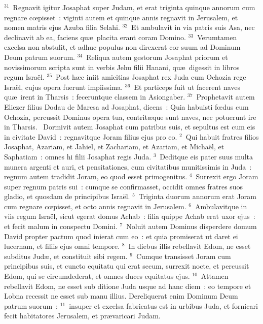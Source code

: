 ${}^{31}$~Regnavit igitur Josaphat super Judam, et erat triginta quinque annorum cum regnare cœpisset~: viginti autem et quinque annis regnavit in Jerusalem, et nomen matris ejus Azuba filia Selahi.
${}^{32}$~Et ambulavit in via patris suis Asa, nec declinavit ab ea, faciens qu\ae\ placita erant coram Domino.
${}^{33}$~Verumtamen excelsa non abstulit, et adhuc populus non direxerat cor suum ad Dominum Deum patrum suorum.
${}^{34}$~Reliqua autem gestorum Josaphat priorum et novissimorum scripta sunt in verbis Jehu filii Hanani, qu\ae\ digessit in libros regum Isra\"el.
${}^{35}$~Post h\ae c iniit amicitias Josaphat rex Juda cum Ochozia rege Isra\"el, cujus opera fuerunt impiissima.
${}^{36}$~Et particeps fuit ut facerent naves qu\ae\ irent in Tharsis~: feceruntque classem in Asiongaber.
${}^{37}$~Prophetavit autem Eliezer filius Dodau de Maresa ad Josaphat, dicens~: Quia habuisti fœdus cum Ochozia, percussit Dominus opera tua, contrit\ae que sunt naves, nec potuerunt ire in Tharsis.
~\lettrine[lines=10,image=true,loversize=0.05,lraise=-0.03]{D}{}ormivit autem Josaphat cum patribus suis, et sepultus est cum eis in civitate David~: regnavitque Joram filius ejus pro eo.
${}^{2}$~Qui habuit fratres filios Josaphat, Azariam, et Jahiel, et Zachariam, et Azariam, et Micha\"el, et Saphatiam~: omnes hi filii Josaphat regis Juda.
${}^{3}$~Deditque eis pater suus multa munera argenti et auri, et pensitationes, cum civitatibus munitissimis in Juda~: regnum autem tradidit Joram, eo quod esset primogenitus.
${}^{4}$~Surrexit ergo Joram super regnum patris sui~: cumque se confirmasset, occidit omnes fratres suos gladio, et quosdam de principibus Isra\"el.
${}^{5}$~Triginta duorum annorum erat Joram cum regnare cœpisset, et octo annis regnavit in Jerusalem.
${}^{6}$~Ambulavitque in viis regum Isra\"el, sicut egerat domus Achab~: filia quippe Achab erat uxor ejus~: et fecit malum in conspectu Domini.
${}^{7}$~Noluit autem Dominus disperdere domum David propter pactum quod inierat cum eo~: et quia promiserat ut daret ei lucernam, et filiis ejus omni tempore.
${}^{8}$~In diebus illis rebellavit Edom, ne esset subditus Jud\ae , et constituit sibi regem.
${}^{9}$~Cumque transisset Joram cum principibus suis, et cuncto equitatu qui erat secum, surrexit nocte, et percussit Edom, qui se circumdederat, et omnes duces equitatus ejus.
${}^{10}$~Attamen rebellavit Edom, ne esset sub ditione Juda usque ad hanc diem~: eo tempore et Lobna recessit ne esset sub manu illius. Dereliquerat enim Dominum Deum patrum suorum~:
${}^{11}$~insuper et excelsa fabricatus est in urbibus Juda, et fornicari fecit habitatores Jerusalem, et pr\ae varicari Judam.


